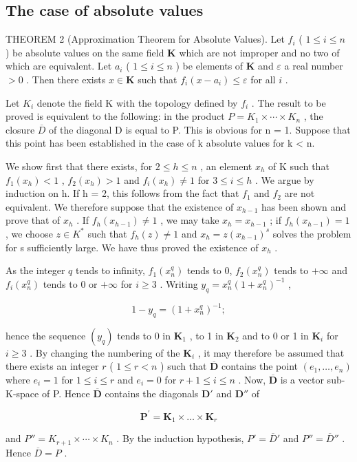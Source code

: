 \subsection{The case of absolute values}

THEOREM 2 (Approximation Theorem for Absolute Values). Let \(f_{i}\) ( \(1 \leqslant i \leqslant n\) ) be absolute values on the same field \(\mathbf{K}\) which are not improper and no two of which are equivalent. Let \(a_{i}\) ( \(1 \leqslant i \leqslant n\) ) be elements of \(\mathbf{K}\) and \(\varepsilon\) a real number \(>0\) . Then there exists \(x \in \mathbf{K}\) such that \(f_{i}(x - a_{i}) \leqslant \varepsilon\) for all \(i\) .

Let \(K_{i}\) denote the field K with the topology defined by \(f_{i}\) . The result to be proved is equivalent to the following: in the product \(P = K_{1} \times \cdots \times K_{n}\) , the closure \(\overline{D}\) of the diagonal D is equal to P. This is obvious for n = 1. Suppose that this point has been established in the case of k absolute values for k < n.

We show first that there exists, for \(2 \leqslant h \leqslant n\) , an element \(x_{h}\) of K such that \(f_{1}(x_{h}) < 1\) , \(f_{2}(x_{h}) > 1\) and \(f_{i}(x_{h}) \neq 1\) for \(3 \leqslant i \leqslant h\) . We argue by induction on h. If h = 2, this follows from the fact that \(f_{1}\) and \(f_{2}\) are not equivalent. We therefore suppose that the existence of \(x_{h-1}\) has been shown and prove that of \(x_{h}\) . If \(f_{h}(x_{h-1}) \neq 1\) , we may take \(x_{h} = x_{h-1}\) ; if \(f_{h}(x_{h-1}) = 1\) , we choose \(z \in K^{*}\) such that \(f_{h}(z) \neq 1\) and \(x_{h} = z(x_{h-1})^{s}\) solves the problem for s sufficiently large. We have thus proved the existence of \(x_{h}\) .

As the integer \(q\) tends to infinity, \(f_{1}(x_{n}^{q})\) tends to 0, \(f_{2}(x_{n}^{q})\) tends to \(+\infty\) and \(f_{i}(x_{n}^{q})\) tends to 0 or \(+\infty\) for \(i \geqslant 3\) . Writing \(y_{q} = x_{n}^{q}(1 + x_{n}^{q})^{-1}\) ,

\[
1 - y _ {q} = (1 + x _ {n} ^ {q}) ^ {- 1};
\]

hence the sequence \((y_q)\) tends to 0 in \(\mathbf{K}_1\) , to 1 in \(\mathbf{K}_2\) and to 0 or 1 in \(\mathbf{K}_i\) for \(i \geqslant 3\) . By changing the numbering of the \(\mathbf{K}_i\) , it may therefore be assumed that there exists an integer \(r\) ( \(1 \leqslant r < n\) ) such that \(\overline{\mathbf{D}}\) contains the point \((e_1, \ldots, e_n)\) where \(e_i = 1\) for \(1 \leqslant i \leqslant r\) and \(e_i = 0\) for \(r + 1 \leqslant i \leqslant n\) . Now, \(\overline{\mathbf{D}}\) is a vector sub-K-space of P. Hence \(\overline{\mathbf{D}}\) contains the diagonals \(\mathbf{D}'\) and \(\mathbf{D}''\) of

\[
\mathbf {P} ^ {\prime} = \mathbf {K} _ {1} \times \dots \times \mathbf {K} _ {r}
\]

and \(P'' = K_{r+1} \times \cdots \times K_n\) . By the induction hypothesis, \(P' = \overline{D}'\) and \(P'' = \overline{D}''\) . Hence \(\overline{D} = P\) .


